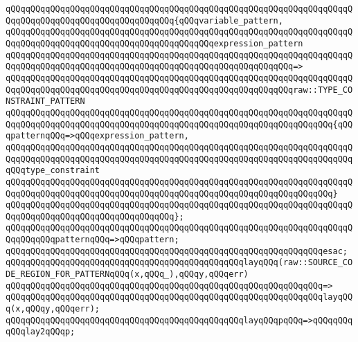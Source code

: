 \verb|qQQqqQQqqQQqqQQqqQQqqQQqqQQqqQQqqQQqqQQqqQQqqQQqqQQqqQQqqQQqqQQqqQQqqQQqqQQqqQQqqQQqqQQqqQQqqQQqqQQqqQQq{qQQqvariable_pattern,|\newline
\verb|qQQqqQQqqQQqqQQqqQQqqQQqqQQqqQQqqQQqqQQqqQQqqQQqqQQqqQQqqQQqqQQqqQQqqQQqqQQqqQQqqQQqqQQqqQQqqQQqqQQqqQQqqQQqqQQqexpression_pattern|\newline
\verb|qQQqqQQqqQQqqQQqqQQqqQQqqQQqqQQqqQQqqQQqqQQqqQQqqQQqqQQqqQQqqQQqqQQqqQQqqQQqqQQqqQQqqQQqqQQqqQQqqQQqqQQqqQQqqQQqqQQqqQQqqQQqqQQq=>|\newline
\verb|qQQqqQQqqQQqqQQqqQQqqQQqqQQqqQQqqQQqqQQqqQQqqQQqqQQqqQQqqQQqqQQqqQQqqQQqqQQqqQQqqQQqqQQqqQQqqQQqqQQqqQQqqQQqqQQqqQQqqQQqqQQqqQQqraw::TYPE_CONSTRAINT_PATTERN|\newline
\verb|qQQqqQQqqQQqqQQqqQQqqQQqqQQqqQQqqQQqqQQqqQQqqQQqqQQqqQQqqQQqqQQqqQQqqQQqqQQqqQQqqQQqqQQqqQQqqQQqqQQqqQQqqQQqqQQqqQQqqQQqqQQqqQQqqQQqqQQq{qQQqpatternqQQq=>qQQqexpression_pattern,|\newline
\verb|qQQqqQQqqQQqqQQqqQQqqQQqqQQqqQQqqQQqqQQqqQQqqQQqqQQqqQQqqQQqqQQqqQQqqQQqqQQqqQQqqQQqqQQqqQQqqQQqqQQqqQQqqQQqqQQqqQQqqQQqqQQqqQQqqQQqqQQqqQQqqQQqtype_constraint|\newline
\verb|qQQqqQQqqQQqqQQqqQQqqQQqqQQqqQQqqQQqqQQqqQQqqQQqqQQqqQQqqQQqqQQqqQQqqQQqqQQqqQQqqQQqqQQqqQQqqQQqqQQqqQQqqQQqqQQqqQQqqQQqqQQqqQQqqQQqqQQq}|\newline
\verb|qQQqqQQqqQQqqQQqqQQqqQQqqQQqqQQqqQQqqQQqqQQqqQQqqQQqqQQqqQQqqQQqqQQqqQQqqQQqqQQqqQQqqQQqqQQqqQQqqQQqqQQq};|\newline
\newline
\verb|qQQqqQQqqQQqqQQqqQQqqQQqqQQqqQQqqQQqqQQqqQQqqQQqqQQqqQQqqQQqqQQqqQQqqQQqqQQqqQQqpatternqQQq=>qQQqpattern;|\newline
\verb|qQQqqQQqqQQqqQQqqQQqqQQqqQQqqQQqqQQqqQQqqQQqqQQqqQQqqQQqqQQqqQQqesac;|\newline
\newline
\newline
\verb|qQQqqQQqqQQqqQQqqQQqqQQqqQQqqQQqqQQqqQQqqQQqqQQqlayqQQq(raw::SOURCE_CODE_REGION_FOR_PATTERNqQQq(x,qQQq_),qQQqy,qQQqerr)|\newline
\verb|qQQqqQQqqQQqqQQqqQQqqQQqqQQqqQQqqQQqqQQqqQQqqQQqqQQqqQQqqQQqqQQq=>|\newline
\verb|qQQqqQQqqQQqqQQqqQQqqQQqqQQqqQQqqQQqqQQqqQQqqQQqqQQqqQQqqQQqqQQqlayqQQq(x,qQQqy,qQQqerr);|\newline
\newline
\verb|qQQqqQQqqQQqqQQqqQQqqQQqqQQqqQQqqQQqqQQqqQQqqQQqlayqQQqpqQQq=>qQQqqQQqqQQqlay2qQQqp;|\newline
